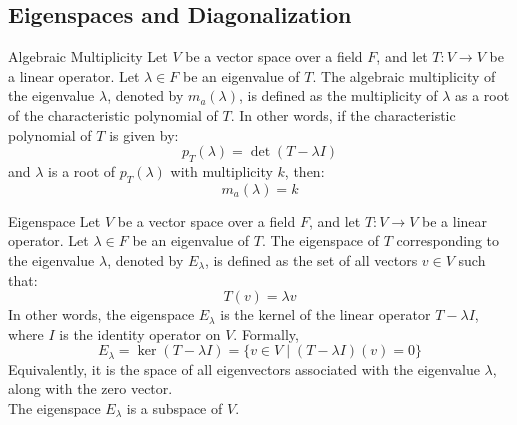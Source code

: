 \documentclass[openany]{book}
\begin{document}
\subsection{Eigenspaces and Diagonalization}
\begin{mydefinition}{Algebraic Multiplicity}
    Let $V$ be a vector space over a field $F$, and let $T: V \to V$ be a linear operator. Let $\lambda \in F$ be an eigenvalue of $T$. The algebraic multiplicity of the eigenvalue $\lambda$, denoted by $m_a(\lambda)$, is defined as the multiplicity of $\lambda$ as a root of the characteristic polynomial of $T$. In other words, if the characteristic polynomial of $T$ is given by:
    $$p_T(\lambda) = \det(T - \lambda I)$$
    and $\lambda$ is a root of $p_T(\lambda)$ with multiplicity $k$, then:
    $$m_a(\lambda) = k$$
\end{mydefinition}
\begin{mydefinition}{Eigenspace}
    Let $V$ be a vector space over a field $F$, and let $T: V \to V$ be a linear operator. Let $\lambda \in F$ be an eigenvalue of $T$. The eigenspace of $T$ corresponding to the eigenvalue $\lambda$, denoted by $E_\lambda$, is defined as the set of all vectors $v \in V$ such that:
    $$T(v) = \lambda v$$
    In other words, the eigenspace $E_\lambda$ is the kernel of the linear operator $T - \lambda I$, where $I$ is the identity operator on $V$. Formally,
    $$E_\lambda = \ker(T - \lambda I) = \{v \in V \mid (T - \lambda I)(v) = 0\}$$
    Equivalently, it is the space of all eigenvectors associated with the eigenvalue $\lambda$, along with the zero vector. \\
    The eigenspace $E_\lambda$ is a subspace of $V$.
\end{mydefinition}
\end{document}
